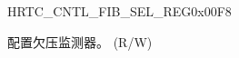 \begin{register}{H}{RTC\_CNTL\_FIB\_SEL\_REG}{0x00F8}\label{regdesc:RTCCNTLFIBSELREG}
%
%
\regnewline%
\begin{regdesc}\begin{reglist}
\label{fielddesc:RTCCNTLRTCFIBSEL}\item [RTC\_CNTL\_RTC\_FIB\_SEL] 配置欠压监测器。 (R/W)
\end{reglist}\end{regdesc}
\end{register}
